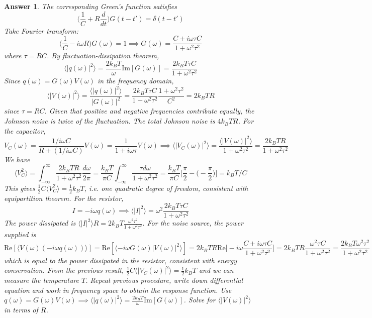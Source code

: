 \documentclass[a4paper]{article}
\theoremstyle{new2}
\newtheorem{ans}{Answer}[section]
\theoremstyle{new}
\begin{document}
\begin{ans}
The corresponding Green's function satisfies
$$\bigg(\frac{1}{C}+R\frac{d}{dt}\bigg)G(t-t')=\delta(t-t')$$
Take Fourier transform:
$$\bigg(\frac{1}{C}-i\omega R\bigg)G(\omega)=1\implies G(\omega)=\frac{C+i\omega\tau C}{1+\omega^2\tau^2}$$
where $\tau=RC$. By fluctuation-dissipation theorem,
$$\langle|q(\omega)|^2\rangle=\frac{2k_BT}{\omega}\text{Im}[G(\omega)]=\frac{2k_BT\tau C}{1+\omega^2\tau^2}$$
Since $q(\omega)=G(\omega)V(\omega)$ in the frequency domain,
$$\langle|V(\omega)|^2\rangle=\frac{\langle|q(\omega)|^2\rangle}{|G(\omega)|^2}=\frac{2k_BT\tau C}{1+\omega^2\tau^2}\frac{1+\omega^2\tau^2}{C^2}=2k_BTR$$
since $\tau=RC$. Given that positive and negative frequencies contribute equally, the Johnson noise is twice of the fluctuation. The total Johnson noise is $4k_BTR$. For the capacitor,
$$V_C(\omega)=\frac{1/i\omega C}{R+(1/i\omega C)}V(\omega)=\frac{1}{1+i\omega\tau}V(\omega)\implies\langle|V_C(\omega)|^2\rangle=\frac{\langle|V(\omega)|^2\rangle}{1+\omega^2\tau^2}=\frac{2k_BTR}{1+\omega^2\tau^2}$$
We have
$$\langle V_C^2\rangle=\int_{-\infty}^\infty\frac{2k_BTR}{1+\omega^2\tau^2}\frac{d\omega}{2\pi}=\frac{k_BT}{\pi C}\int_{-\infty}^\infty\frac{\tau d\omega}{1+\omega^2\tau^2}=\frac{k_BT}{\pi C}\bigg[\frac{\pi}{2}-\bigg(-\frac{\pi}{2}\bigg)\bigg]=k_BT/C$$
This gives $\frac{1}{2}C\langle V_C^2\rangle=\frac{1}{2}k_BT$, i.e. one quadratic degree of freedom, consistent with equipartition theorem. For the resistor,
$$I=-i\omega q(\omega)\implies\langle|I|^2\rangle=\omega^2\frac{2k_BT\tau C}{1+\omega^2\tau^2}$$
The power dissipated is $\langle|I|^2\rangle R=2k_BT\frac{\omega^2\tau^2}{1+\omega^2\tau^2}$. For the noise source, the power supplied is
$$\text{Re}[\langle V(\omega)(-i\omega q(\omega))\rangle]=\text{Re}[\langle-i\omega G(\omega)|V(\omega)|^2\rangle]=2k_BTR\text{Re}\bigg[-i\omega\frac{C+i\omega\tau C}{1+\omega^2\tau^2}\bigg]=2k_BTR\frac{\omega^2\tau C}{1+\omega^2\tau^2}=\frac{2k_BT\omega^2\tau^2}{1+\omega^2\tau^2}$$
which is equal to the power dissipated in the resistor, consistent with energy conservation. From the previous result, $\frac{1}{2}C\langle|V_C(\omega)|^2\rangle=\frac{1}{2}k_BT$ and we can measure the temperature $T$. Repeat previous procedure, write down differential equation and work in frequency space to obtain the response function. Use $q(\omega)=G(\omega)V(\omega)\implies\langle|q(\omega)|^2\rangle=\frac{2k_BT}{\omega}\text{Im}[G(\omega)]$. Solve for $\langle|V(\omega)|^2\rangle$ in terms of $R$.
\end{ans}
\end{document}
